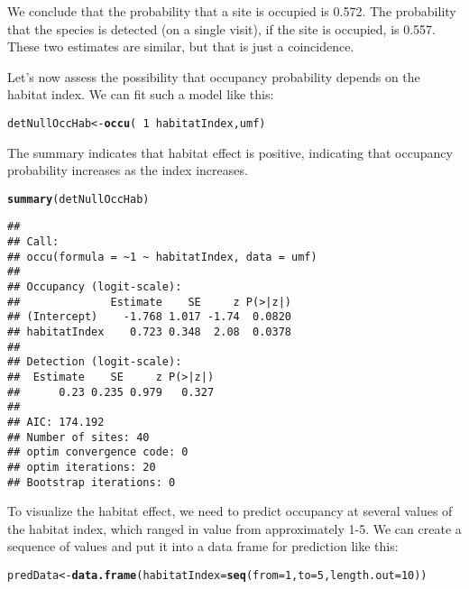 \documentclass[12pt]{article}\usepackage[]{graphicx}\usepackage[]{color}
\makeatletter
\newcommand{\hlnum}[1]{\textcolor[rgb]{0.686,0.059,0.569}{#1}}%
\newcommand{\hlopt}[1]{\textcolor[rgb]{0,0,0}{#1}}%
\newcommand{\hlstd}[1]{\textcolor[rgb]{0.345,0.345,0.345}{#1}}%
\newcommand{\hlkwb}[1]{\textcolor[rgb]{0.69,0.353,0.396}{#1}}%
\newcommand{\hlkwc}[1]{\textcolor[rgb]{0.333,0.667,0.333}{#1}}%
\newcommand{\hlkwd}[1]{\textcolor[rgb]{0.737,0.353,0.396}{\textbf{#1}}}%
\newenvironment{kframe}{%
 \def\at@end@of@kframe{}%
 \ifinner\ifhmode%
  \def\at@end@of@kframe{\end{minipage}}%
  \begin{minipage}{\columnwidth}%
 \fi\fi%
 \def\FrameCommand##1{\hskip\@totalleftmargin \hskip-\fboxsep
 \colorbox{shadecolor}{##1}\hskip-\fboxsep
     \hskip-\linewidth \hskip-\@totalleftmargin \hskip\columnwidth}%
 \MakeFramed {\advance\hsize-\width
   \@totalleftmargin\z@ \linewidth\hsize
   \@setminipage}}%
 {\par\unskip\endMakeFramed%
 \at@end@of@kframe}
\newenvironment{knitrout}{}{} %
\makeatother
\begin{document}
We conclude that the probability that a site is occupied is 0.572. The
probability that the species is detected (on a single visit), if the
site is occupied, is 0.557. These two estimates are similar, but that
is just a coincidence.

Let's now assess the possibility that occupancy probability depends on
the habitat index. We can fit such a model like this: 

\begin{knitrout}
\color{fgcolor}\begin{kframe}
\begin{alltt}
\hlstd{detNullOccHab} \hlkwb{<-} \hlkwd{occu}\hlstd{(}\hlopt{~}\hlnum{1} \hlopt{~}\hlstd{habitatIndex, umf)}
\end{alltt}
\end{kframe}
\end{knitrout}

The summary indicates that habitat effect is positive, indicating that
occupancy probability increases as the index increases.  

\begin{knitrout}
\color{fgcolor}\begin{kframe}
\begin{alltt}
\hlkwd{summary}\hlstd{(detNullOccHab)}
\end{alltt}
\begin{verbatim}
## 
## Call:
## occu(formula = ~1 ~ habitatIndex, data = umf)
## 
## Occupancy (logit-scale):
##              Estimate    SE     z P(>|z|)
## (Intercept)    -1.768 1.017 -1.74  0.0820
## habitatIndex    0.723 0.348  2.08  0.0378
## 
## Detection (logit-scale):
##  Estimate    SE     z P(>|z|)
##      0.23 0.235 0.979   0.327
## 
## AIC: 174.192 
## Number of sites: 40
## optim convergence code: 0
## optim iterations: 20 
## Bootstrap iterations: 0
\end{verbatim}
\end{kframe}
\end{knitrout}


To visualize the habitat effect, we need to predict occupancy at
several values of the habitat index, which ranged in value from
approximately 1-5. We can create a sequence of values and put it into
a data frame for prediction like this: 

\begin{knitrout}
\color{fgcolor}\begin{kframe}
\begin{alltt}
\hlstd{predData} \hlkwb{<-} \hlkwd{data.frame}\hlstd{(}\hlkwc{habitatIndex}\hlstd{=}\hlkwd{seq}\hlstd{(}\hlkwc{from}\hlstd{=}\hlnum{1}\hlstd{,} \hlkwc{to}\hlstd{=}\hlnum{5}\hlstd{,} \hlkwc{length.out}\hlstd{=}\hlnum{10}\hlstd{))}
\end{alltt}
\end{kframe}
\end{knitrout}
\end{document}
